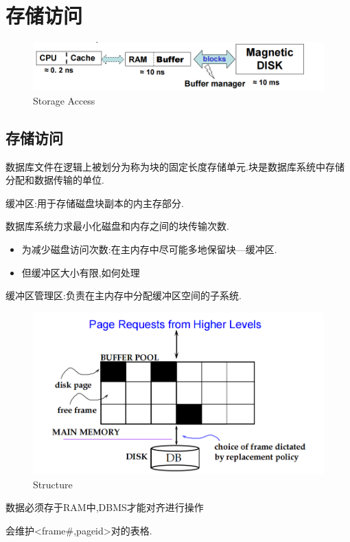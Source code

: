 \section{存储访问}

\begin{figure}[H]
    \centering
    \includegraphics[width=0.8\linewidth]{image6.png}
    \caption{Storage Access}
    \label{}
\end{figure}

\subsection{存储访问}

数据库文件在逻辑上被划分为称为块的固定长度存储单元.块是数据库系统中存储分配和数据传输的单位.

缓冲区:用于存储磁盘块副本的内主存部分.

数据库系统力求最小化磁盘和内存之间的块传输次数.

\begin{itemize}
    \item 为减少磁盘访问次数:在主内存中尽可能多地保留块---缓冲区.
    \item 但缓冲区大小有限,如何处理
\end{itemize}

缓冲区管理区:负责在主内存中分配缓冲区空间的子系统.

\begin{figure}[H]
    \centering
    \includegraphics[width=0.8\linewidth]{image7.png}
    \caption{Structure}
    \label{}
\end{figure}

数据必须存于RAM中,DBMS才能对齐进行操作

会维护<frame\#,pageid>对的表格.

